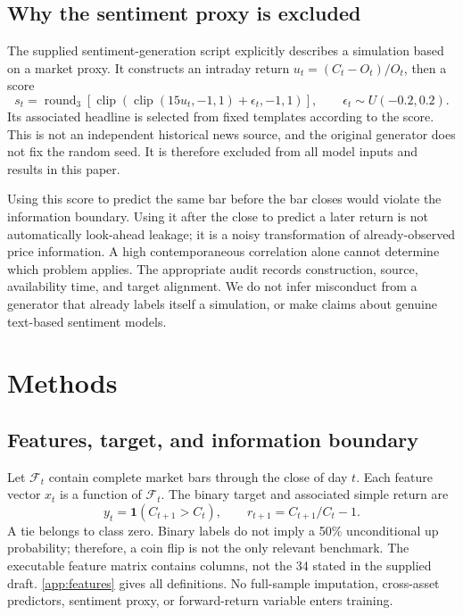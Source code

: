 \documentclass[preprint,12pt,authoryear]{elsarticle}
\newcommand{\ind}{\mathbf{1}}
\begin{document}
\subsection{Why the sentiment proxy is excluded}
The supplied sentiment-generation script explicitly describes a simulation based on a market proxy. It constructs an intraday return $u_t=(C_t-O_t)/O_t$, then a score
\begin{equation}
 s_t=\operatorname{round}_3\!\left[\operatorname{clip}\!\left(
 \operatorname{clip}(15u_t,-1,1)+\epsilon_t,-1,1\right)\right],
 \qquad \epsilon_t\sim U(-0.2,0.2).
\end{equation}
Its associated headline is selected from fixed templates according to the score. This is not an independent historical news source, and the original generator does not fix the random seed. It is therefore excluded from all model inputs and results in this paper.

Using this score to predict the same bar before the bar closes would violate the information boundary. Using it after the close to predict a later return is not automatically look-ahead leakage; it is a noisy transformation of already-observed price information. A high contemporaneous correlation alone cannot determine which problem applies. The appropriate audit records construction, source, availability time, and target alignment. We do not infer misconduct from a generator that already labels itself a simulation, or make claims about genuine text-based sentiment models.

\section{Methods}
\subsection{Features, target, and information boundary}
Let $\mathcal F_t$ contain complete market bars through the close of day $t$. Each feature vector $x_t$ is a function of $\mathcal F_t$. The binary target and associated simple return are
\begin{equation}
 y_t=\ind(C_{t+1}>C_t),\qquad r_{t+1}=C_{t+1}/C_t-1.
\end{equation}
A tie belongs to class zero. Binary labels do not imply a 50\% unconditional up probability; therefore, a coin flip is not the only relevant benchmark. The executable feature matrix contains \FeatureCount{} columns, not the 34 stated in the supplied draft. \ref{app:features} gives all definitions. No full-sample imputation, cross-asset predictors, sentiment proxy, or forward-return variable enters training.
\end{document}
